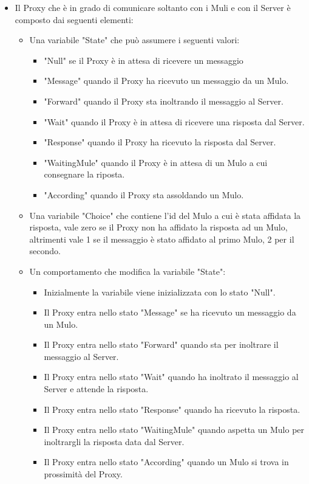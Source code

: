 \documentclass[13pt,a4paper]{article}
\begin{document}
\begin{itemize}
		
		\item Il Proxy che è in grado di comunicare soltanto con i Muli e con il Server è composto dai seguenti elementi: 
		\begin{itemize}
			\item Una variabile "State" che può assumere i seguenti valori:
			\begin{itemize}
				\item "Null" se il Proxy è in attesa di ricevere un messaggio
				\item "Message" quando il Proxy ha ricevuto un messaggio da un Mulo.
				\item "Forward" quando il Proxy sta inoltrando il messaggio al Server.
				\item "Wait" quando il Proxy è in attesa di ricevere una risposta dal Server.
				\item "Response" quando il Proxy ha ricevuto la risposta dal Server.
				\item "WaitingMule" quando il Proxy è in attesa di un Mulo a cui consegnare la riposta. 
				\item "According" quando il Proxy sta assoldando un Mulo.
			\end{itemize}
			\item Una variabile "Choice" che contiene l'id del Mulo a cui è stata affidata la risposta, vale zero se il Proxy non ha  affidato la risposta ad un Mulo, altrimenti vale 1 se il messaggio è stato affidato al primo Mulo, 2 per il secondo.
			\item Un comportamento che modifica la variabile "State":
			\begin{itemize}
				\item Inizialmente la variabile viene inizializzata con lo stato "Null".
				\item Il Proxy entra nello stato "Message" se ha ricevuto un messaggio da un Mulo.
				\item Il Proxy entra nello stato "Forward" quando sta per inoltrare il messaggio al Server.
				\item Il Proxy entra nello stato "Wait" quando ha inoltrato il messaggio al Server e attende la risposta.
				\item Il Proxy entra nello stato "Response" quando ha ricevuto la risposta.
				\item Il Proxy entra nello stato "WaitingMule" quando aspetta un Mulo per inoltrargli la risposta data dal Server.
				\item Il Proxy entra nello stato "According" quando un Mulo si trova in prossimità del Proxy.

\end{itemize}
\end{itemize}
\end{itemize}
\end{document}
